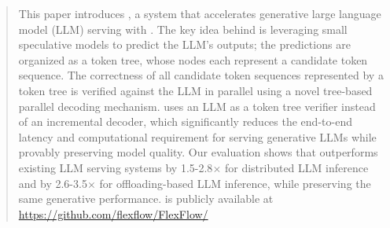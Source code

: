 \begin{abstract}

This paper introduces \sys, a system that accelerates generative large language model (LLM) serving with .
The key idea behind \Sys is leveraging small speculative models to predict the LLM’s outputs; the predictions are organized as a token tree, whose nodes each represent a candidate token sequence.
The correctness of all candidate token sequences represented by a token tree is verified against the LLM in parallel using a novel tree-based parallel decoding mechanism.
\Sys uses an LLM as a token tree verifier instead of an incremental decoder, which significantly reduces the end-to-end latency and computational requirement for serving generative LLMs while provably preserving model quality. 
Our evaluation shows that \sys outperforms existing LLM serving systems by 1.5-2.8$\times$ for distributed LLM inference and by 2.6-3.5$\times$ for offloading-based LLM inference, while preserving the same generative performance.
\Sys is publicly available at \url{https://github.com/flexflow/FlexFlow/}

\end{abstract}
